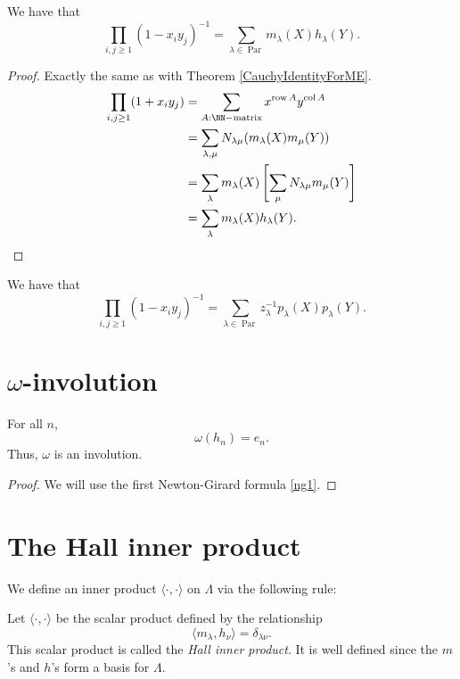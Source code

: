 \documentclass{article}
\DeclareMathOperator{\row}{row}
\DeclareMathOperator{\col}{col}
\DeclareMathOperator{\Par}{Par}
\begin{document}
\begin{theorem}\label{CauchyIdentityForMH}
    We have that
    \[
        \prod_{i,j \geq 1} (1-x_iy_j)^{-1} = \sum_{\lambda\in\Par} m_\lambda(X) h_\lambda(Y).
    \]
\end{theorem}

\begin{proof}
    Exactly the same as with Theorem \ref{CauchyIdentityForME}.
    \begin{align*}
        \prod_{i,j\geq1}(1+x_iy_j) &= \sum_{A:\NN-\text{matrix}}x^{\row A}y^{\col A} \\
                                   &= \sum_{\lambda,\mu} N_{\lambda\mu} (m_\lambda(X) m_\mu(Y)) \\
                                   &= \sum_{\lambda} m_\lambda(X) \left[\sum_\mu N_{\lambda\mu} m_\mu(Y)\right]\\
                                   &= \sum_\lambda m_\lambda(X) h_\lambda(Y).
    \end{align*}
\end{proof}

\begin{theorem}\label{CauchyIdentityForPP}
    We have that
    \[
        \prod_{i,j \geq 1} (1-x_iy_j)^{-1} = \sum_{\lambda\in\Par} z_\lambda^{-1}p_\lambda(X) p_\lambda(Y).
    \]
\end{theorem}

\section{\texorpdfstring{$\omega$}{w}-involution}


\begin{theorem}
    For all $n$,
    \[
        \omega(h_n) = e_n.
    \]
    Thus, $\omega$ is an involution.
\end{theorem}

\begin{proof}
    We will use the first Newton-Girard formula \eqref{ng1}.
\end{proof}

\section{The Hall inner product}

We define an inner product $\langle \cdot, \cdot \rangle$ on $\Lambda$ via the following rule:

\begin{definition} Let $\langle\cdot,\cdot\rangle$ be the scalar product defined by the relationship
    \[
        \langle m_\lambda, h_\nu \rangle = \delta_{\lambda\nu}.
    \]
    This scalar product is called the \textit{Hall inner product}. It is well defined since the $m$'s and $h$'s form a basis for $\Lambda$.
\end{definition}
\end{document}
